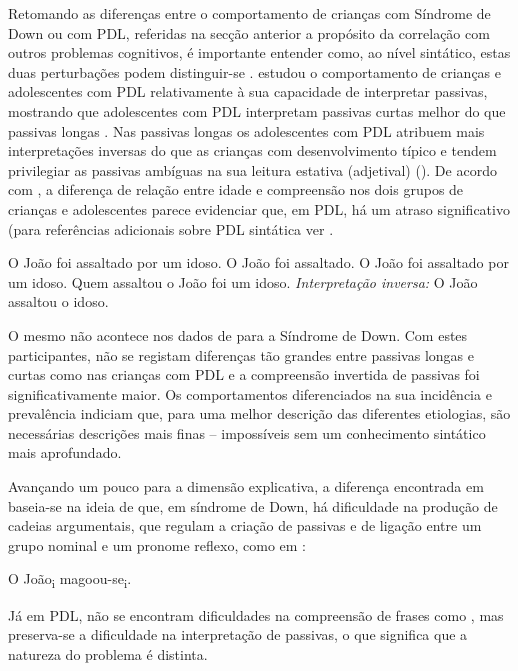 \documentclass[output=paper,colorlinks,citecolor=brown,booklanguage=portuguese]{langscibook}
\begin{document}
Retomando as diferenças entre o comportamento de crianças com Síndrome de Down ou com PDL, referidas na secção anterior a propósito da correlação com outros problemas cognitivos, é importante entender como, ao nível sintático, estas duas perturbações podem distinguir-se \citep{Lely1996, Ring2005}. \citeauthor{Lely1996} estudou o comportamento de crianças e adolescentes com PDL relativamente à sua capacidade de interpretar passivas, mostrando que adolescentes com PDL interpretam passivas curtas  melhor do que passivas longas . Nas passivas longas os adolescentes com PDL atribuem mais interpretações inversas do que as crianças com desenvolvimento típico  e tendem privilegiar as passivas ambíguas na sua leitura estativa (adjetival) (\citealt{Guasti2002}). De acordo com \citet{Ring2005}, a diferença de relação entre idade e compreensão nos dois grupos de crianças e adolescentes parece evidenciar que, em PDL, há um atraso significativo (para referências adicionais sobre PDL sintática ver . 

\ea
        \ea\label{ex:cap2ex14a} O João foi assaltado por um idoso.
        \ex\label{ex:cap2ex14b} O João foi assaltado.
    \z
\z
\ea\label{ex:cap2ex15} O João foi assaltado por um idoso.
     Quem assaltou o João foi um idoso.
    \ex \emph{Interpretação inversa:} O João assaltou o idoso.
\z
\z

O mesmo não acontece nos dados de \citeauthor{Ring2005} para a Síndrome de Down. Com estes participantes, não se registam diferenças tão grandes entre passivas longas e curtas como nas crianças com PDL e a compreensão invertida de passivas foi significativamente maior. Os comportamentos diferenciados na sua incidência e prevalência indiciam que, para uma melhor descrição das diferentes etiologias, são necessárias descrições mais finas -- impossíveis sem um conhecimento sintático mais aprofundado.

Avançando um pouco para a dimensão explicativa, a diferença encontrada em \citet{Perovic2013} baseia-se na ideia de que, em síndrome de Down, há dificuldade na produção de cadeias argumentais, que regulam a criação de passivas e de ligação entre um grupo nominal e um pronome reflexo, como em :

\ea\label{ex:cap2ex16} O João\textsubscript{i} magoou-se\textsubscript{i}.
\z

Já em PDL, não se encontram dificuldades na compreensão de frases como , mas preserva-se a dificuldade na interpretação de passivas, o que significa que a natureza do problema é distinta.
\end{document}
